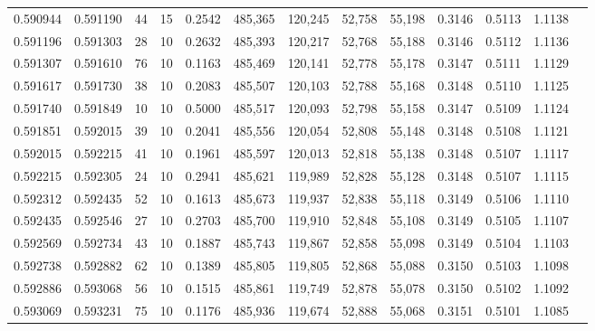 \begin{tabular}{rrrrrrrrrrrrr}
0.590944 & 0.591190 &    44 &  15 &                                     0.2542 & 485,365 & 120,245 &  52,758 &  55,198 & 0.3146 & 0.5113 & 1.1138 \\
0.591196 & 0.591303 &    28 &  10 &                                     0.2632 & 485,393 & 120,217 &  52,768 &  55,188 & 0.3146 & 0.5112 & 1.1136 \\
0.591307 & 0.591610 &    76 &  10 &                                     0.1163 & 485,469 & 120,141 &  52,778 &  55,178 & 0.3147 & 0.5111 & 1.1129 \\
0.591617 & 0.591730 &    38 &  10 &                                     0.2083 & 485,507 & 120,103 &  52,788 &  55,168 & 0.3148 & 0.5110 & 1.1125 \\
0.591740 & 0.591849 &    10 &  10 &                                     0.5000 & 485,517 & 120,093 &  52,798 &  55,158 & 0.3147 & 0.5109 & 1.1124 \\
0.591851 & 0.592015 &    39 &  10 &                                     0.2041 & 485,556 & 120,054 &  52,808 &  55,148 & 0.3148 & 0.5108 & 1.1121 \\
0.592015 & 0.592215 &    41 &  10 &                                     0.1961 & 485,597 & 120,013 &  52,818 &  55,138 & 0.3148 & 0.5107 & 1.1117 \\
0.592215 & 0.592305 &    24 &  10 &                                     0.2941 & 485,621 & 119,989 &  52,828 &  55,128 & 0.3148 & 0.5107 & 1.1115 \\
0.592312 & 0.592435 &    52 &  10 &                                     0.1613 & 485,673 & 119,937 &  52,838 &  55,118 & 0.3149 & 0.5106 & 1.1110 \\
0.592435 & 0.592546 &    27 &  10 &                                     0.2703 & 485,700 & 119,910 &  52,848 &  55,108 & 0.3149 & 0.5105 & 1.1107 \\
0.592569 & 0.592734 &    43 &  10 &                                     0.1887 & 485,743 & 119,867 &  52,858 &  55,098 & 0.3149 & 0.5104 & 1.1103 \\
0.592738 & 0.592882 &    62 &  10 &                                     0.1389 & 485,805 & 119,805 &  52,868 &  55,088 & 0.3150 & 0.5103 & 1.1098 \\
0.592886 & 0.593068 &    56 &  10 &                                     0.1515 & 485,861 & 119,749 &  52,878 &  55,078 & 0.3150 & 0.5102 & 1.1092 \\
0.593069 & 0.593231 &    75 &  10 &                                     0.1176 & 485,936 & 119,674 &  52,888 &  55,068 & 0.3151 & 0.5101 & 1.1085 \\

\end{tabular}
